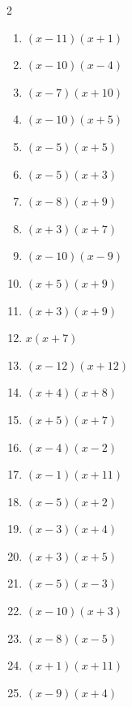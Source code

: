 \documentclass[11pt,oneside]{book}
\begin{document}
\begin{multicols}{2}
\begin{enumerate}[leftmargin=*,label=\textbf{E\arabic*.},itemsep=0.45\baselineskip]
\item $ \left(x - 11\right) \left(x + 1\right) $
\item $ \left(x - 10\right) \left(x - 4\right) $
\item $ \left(x - 7\right) \left(x + 10\right) $
\item $ \left(x - 10\right) \left(x + 5\right) $
\item $ \left(x - 5\right) \left(x + 5\right) $
\item $ \left(x - 5\right) \left(x + 3\right) $
\item $ \left(x - 8\right) \left(x + 9\right) $
\item $ \left(x + 3\right) \left(x + 7\right) $
\item $ \left(x - 10\right) \left(x - 9\right) $
\item $ \left(x + 5\right) \left(x + 9\right) $
\item $ \left(x + 3\right) \left(x + 9\right) $
\item $ x \left(x + 7\right) $
\item $ \left(x - 12\right) \left(x + 12\right) $
\item $ \left(x + 4\right) \left(x + 8\right) $
\item $ \left(x + 5\right) \left(x + 7\right) $
\item $ \left(x - 4\right) \left(x - 2\right) $
\item $ \left(x - 1\right) \left(x + 11\right) $
\item $ \left(x - 5\right) \left(x + 2\right) $
\item $ \left(x - 3\right) \left(x + 4\right) $
\item $ \left(x + 3\right) \left(x + 5\right) $
\item $ \left(x - 5\right) \left(x - 3\right) $
\item $ \left(x - 10\right) \left(x + 3\right) $
\item $ \left(x - 8\right) \left(x - 5\right) $
\item $ \left(x + 1\right) \left(x + 11\right) $
\item $ \left(x - 9\right) \left(x + 4\right) $
\end{enumerate}
\end{multicols}
\end{document}
